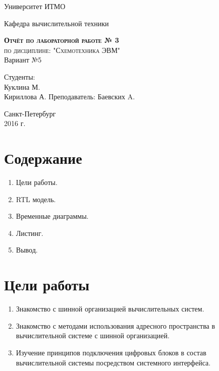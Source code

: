 \documentclass[a4paper, 10pt]{article}
\begin{document}
    \begin{titlepage}
        \begin{center}
            \large
            Университет ИТМО
            \vspace{3cm}


            Кафедра вычислительной техники
            \vspace{4cm}

            \textsc{ \textbf{Отчёт по лабораторной работе  № 3} \\
            по дисциплине: "Схемотехника ЭВМ"}\\Вариант №5\\[8mm]

            \bigskip
        \end{center}
        \vspace{3cm}

        \hfill\begin{flushright}
             Студенты: \\
             Куклина М.\\
             Кириллова А.
             \vfill
             Преподаватель:
             Баевских A.
        \end{flushright}
        \vfill
        \vfill
        \vfill
        \vfill
        \vfill
        \begin{center}
            Санкт-Петербург \\2016 г.
        \end{center}
    \end{titlepage}
   \newpage
    \section*{Содержание}
        \begin{enumerate}
            \item Цели работы.
            \item RTL модель.
            \item Временные диаграммы.
            \item Листинг.
            \item Вывод.
        \end{enumerate}

    \section*{Цели работы}
        \begin{enumerate}
            \item  Знакомство с шинной организацией вычислительных систем.
            \item  Знакомство с методами использования адресного пространства в
                   вычислительной системе с шинной организацией.
            \item  Изучение принципов подключения цифровых блоков в состав
                   вычислительной системы посредством системного интерфейса.

        \end{enumerate}
\end{document}
